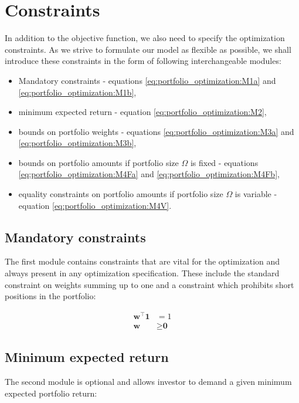 \section{Constraints}

In addition to the objective function, we also need to specify the optimization constraints. As we strive to formulate our model as flexible as possible, we shall introduce these constraints in the form of following interchangeable modules:
\begin{itemize}
	\item Mandatory constraints - equations \ref{eq:portfolio_optimization:M1a} and \ref{eq:portfolio_optimization:M1b},
	\item minimum expected return - equation \ref{eq:portfolio_optimization:M2},
	\item bounds on portfolio weights - equations \ref{eq:portfolio_optimization:M3a} and \ref{eq:portfolio_optimization:M3b},
	\item bounds on portfolio amounts if portfolio size $\Omega$ is fixed - equations \ref{eq:portfolio_optimization:M4Fa} and \ref{eq:portfolio_optimization:M4Fb},
	\item equality constraints on portfolio amounts if portfolio size $\Omega$ is variable - equation \ref{eq:portfolio_optimization:M4V}.
\end{itemize}

\subsection{Mandatory constraints}

The first module contains constraints that are vital for the optimization and always present in any optimization specification. These include the standard constraint on weights summing up to one and a constraint which prohibits short positions in the portfolio:

\begin{align}
\mathbf{w}^\top \textbf{1}&=1 \tag{M1a} \label{eq:portfolio_optimization:M1a}\\ 
\mathbf{w} &\geq \textbf{0} \tag{M1b} \label{eq:portfolio_optimization:M1b}
\end{align}

\subsection{Minimum expected return}


The second module is optional and allows investor to demand a given minimum expected portfolio return:

